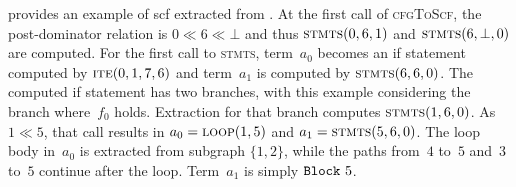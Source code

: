 \begin{example}
   provides an example of \ac{scf} extracted from .
  At the first call of \textsc{cfgToScf},
  the post-dominator relation is $0\ll 6\ll\bot$
  and thus $\textsc{stmts}(0,6,1)$ and $\textsc{stmts}(6,\bot,0)$ are computed.
  For the first call to \textsc{stmts},
  term~$a_0$ becomes an if statement computed by $\textsc{ite}(0,1,7,6)$
  and term~$a_1$ is computed by $\textsc{stmts}(6,6,0)$.
  The computed if statement has two branches,
  with this example considering the branch where~$f_0$ holds.
  Extraction for that branch computes $\textsc{stmts}(1,6,0)$.
  As $1\ll 5$, that call results in $a_0=\textsc{loop}(1,5)$
  and $a_1=\textsc{stmts}(5,6,0)$.
  The loop body in~$a_0$ is extracted from subgraph $\{1,2\}$,
  while the paths from~$4$ to~$5$ and~$3$ to~$5$ continue after the loop.
  Term~$a_1$ is simply $\texttt{Block}~5$.
\end{example}

